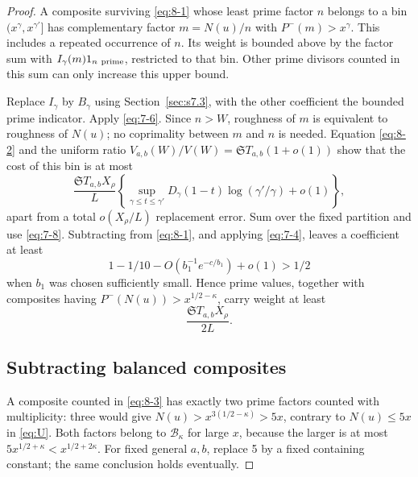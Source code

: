 \documentclass[11pt]{article}
\theoremstyle{definition}
\theoremstyle{definition}
\begin{document}
\begin{proof}
A composite surviving \eqref{eq:8-1} whose least prime factor \(n\) belongs to a bin \((x^\gamma,x^{\gamma'}]\) has complementary factor \(m=N(u)/n\) with \(P^-(m)>x^\gamma\). This includes a repeated occurrence of \(n\). Its weight is bounded above by the factor sum with \(I_\gamma(m)1_{n\ {\rm prime}}\), restricted to that bin. Other prime divisors counted in this sum can only increase this upper bound.

Replace \(I_\gamma\) by \(B_\gamma\) using Section~\ref{sec:s7.3}, with the other coefficient the bounded prime indicator. Apply \eqref{eq:7-6}. Since \(n>W\), roughness of \(m\) is equivalent to roughness of \(N(u)\); no coprimality between \(m\) and \(n\) is needed. Equation \eqref{eq:8-2} and the uniform ratio \(V_{a,b}(W)/V(W)=\mathfrak S T_{a,b}(1+o(1))\) show that the cost of this bin is at most
\begin{equation*}
\frac{\mathfrak S T_{a,b}X_\rho}{L}
 \left\{\sup_{\gamma\le t\le\gamma'}D_\gamma(1-t)
                          \log(\gamma'/\gamma)+o(1)\right\},
\end{equation*}
apart from a total \(o(X_\rho/L)\) replacement error. Sum over the fixed partition and use \eqref{eq:7-8}. Subtracting from \eqref{eq:8-1}, and applying \eqref{eq:7-4}, leaves a coefficient at least
\begin{equation*}
1-1/10-O(b_1^{-1}e^{-c/b_1})+o(1)>1/2
\end{equation*}
when \(b_1\) was chosen sufficiently small. Hence prime values, together with composites having \(P^-(N(u))>x^{1/2-\kappa}\), carry weight at least
\begin{equation}
\frac{\mathfrak S T_{a,b}X_\rho}{2L}.                  \tag{8.3}\label{eq:8-3}
\end{equation}

\subsection{Subtracting balanced composites}\label{sec:s8.4}

A composite counted in \eqref{eq:8-3} has exactly two prime factors counted with multiplicity: three would give
\(N(u)>x^{3(1/2-\kappa)}>5x\), contrary to \(N(u)\le5x\) in \eqref{eq:U}. Both factors belong to \(\mathcal B_\kappa\) for large \(x\), because the larger is at most \(5x^{1/2+\kappa}<x^{1/2+2\kappa}\). For fixed general \(a,b\), replace 5 by a fixed containing constant; the same conclusion holds eventually.


\end{proof}
\end{document}
